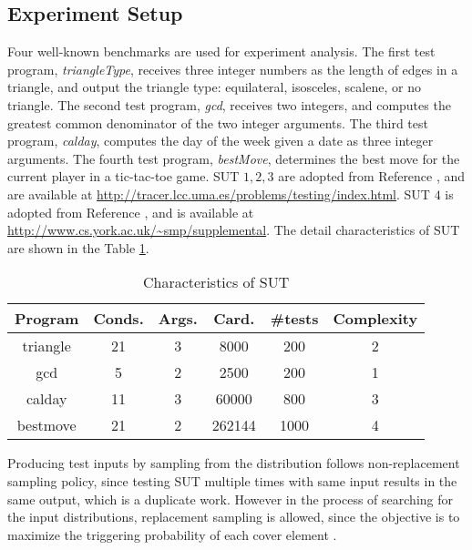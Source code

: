 \documentclass[journal]{IEEEtran}
\begin{document}
\subsection{Experiment Setup}
Four well-known benchmarks are used for experiment analysis. The first test program, \emph{triangleType}, receives three integer numbers as the length of edges in a triangle, and output the triangle type: equilateral, isosceles, scalene, or no triangle. The second test program, \emph{gcd}, receives two integers, and computes the greatest common denominator of the two integer arguments. The third test program, \emph{calday}, computes the day of the week given a date as three integer arguments. The fourth test program, \emph{bestMove}, determines the best move for the current player in a tic-tac-toe game. SUT \(1,2,3\) are adopted from Reference \cite{sut}, and are available at \url{http://tracer.lcc.uma.es/problems/testing/index.html}. SUT \(4\) is adopted from Reference \cite{searchST}, and is available at \url{http://www.cs.york.ac.uk/~smp/supplemental}. The detail characteristics of SUT are shown in the Table \ref{table:1}. %
\begin{table}[t]
\begin{center}
	\begin{tabular}{ |c|c|c|c|c|c|} 
		\hline
		\textbf{Program} & \textbf{Conds.} & \textbf{Args.} & \textbf{Card.} & \textbf{\#tests}  &\textbf{Complexity}\\
		\hline
		triangle & 21 & 3 & 8000 & 200& 2\\ 
		gcd      & 5  & 2 & 2500 & 200  & 1\\ 
		calday   & 11 & 3 & 60000 & 800 & 3\\
		bestmove & 21 & 2 & 262144 & 1000  & 4\\
		\hline
	\end{tabular}
	\caption{Characteristics of SUT}
	\label{table:1}
\end{center}
\end{table}


Producing test inputs by sampling from the distribution follows non-replacement sampling policy, since testing SUT multiple times with same input results in the same output, which is a duplicate work. However in the process of searching for the input distributions, replacement sampling is allowed, since the objective is to maximize the triggering probability of each cover element .
\end{document}
